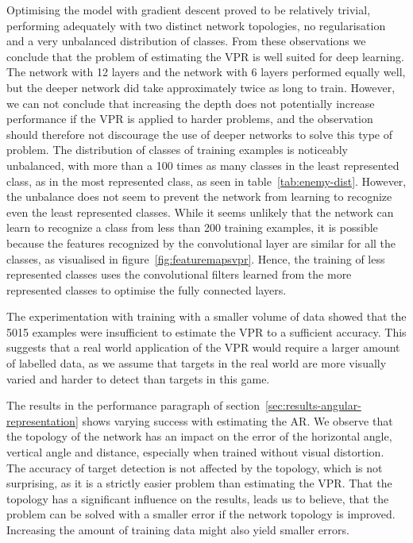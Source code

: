Optimising the model with gradient descent proved to be relatively trivial, performing adequately with two distinct network topologies, no regularisation and a very unbalanced distribution of classes. From these observations we conclude that the problem of estimating the VPR is well suited for deep learning. The network with 12 layers and the network with 6 layers performed equally well, but the deeper network did take approximately twice as long to train. However, we can not conclude that increasing the depth does not potentially increase performance if the VPR is applied to harder problems, and the observation should therefore not discourage the use of deeper networks to solve this type of problem. The distribution of classes of training examples is noticeably unbalanced, with more than a 100 times as many classes in the least represented class, as in the most represented class, as seen in table~\ref{tab:enemy-dist}. However, the unbalance does not seem to prevent the network from learning to recognize even the least represented classes. While it seems unlikely that the network can learn to recognize a class from less than 200 training examples, it is possible because the features recognized by the convolutional layer are similar for all the classes, as visualised in figure~\ref{fig:featuremapsvpr}. Hence, the training of less represented classes uses the convolutional filters learned from the more represented classes to optimise the fully connected layers.

The experimentation with training with a smaller volume of data showed that the 5015 examples were insufficient to estimate the VPR to a sufficient accuracy. This suggests that a real world application of the VPR would require a larger amount of labelled data, as we assume that targets in the real world are more visually varied and harder to detect than targets in this game.

The results in the performance paragraph of section~\ref{sec:results-angular-representation} shows varying success with estimating the AR. We observe that the topology of the network has an impact on the error of the horizontal angle, vertical angle and distance, especially when trained without visual distortion. The accuracy of target detection is not affected by the topology, which is not surprising, as it is a strictly easier problem than estimating the VPR. That the topology has a significant influence on the results, leads us to believe, that the problem can be solved with a smaller error if the network topology is improved. Increasing the amount of training data might also yield smaller errors.

